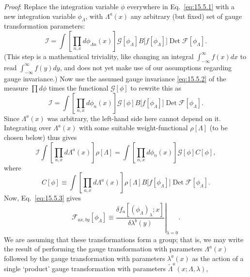 \emph{Proof}: Replace the integration variable $\phi$ everywhere in
Eq.~\eqref{eq:15.5.1} with a new integration variable $\phi_\Lambda$, with
$\Lambda^a(x)$ any arbitrary (but fixed) set of gauge transformation
parameters:
\begin{equation}
  \mathcal I=\int\left[\prod_{n,x}d\phi_{\Lambda n}(x)\right]
  \mathcal G[\phi_\Lambda]B\bigl[f[\phi_\Lambda]\bigr]
  \operatorname{Det}\mathcal F[\phi_\Lambda].
  \tag{15.5.8}\label{eq:15.5.8}
\end{equation}
(This step is a mathematical triviality, like changing an integral
$\int_{-\infty}^{\infty}f(x)dx$ to read
$\int_{-\infty}^{\infty}f(y)dy$, and does not yet make use of our assumptions
regarding gauge invariance.) Now use the assumed gauge invariance
\eqref{eq:15.5.2} of the measure $\prod d\phi$ times the functional
$\mathcal G[\phi]$ to rewrite this as
\begin{equation}
  \mathcal I=\int\left[\prod_{n,x}d\phi_n(x)\right]
  \mathcal G[\phi]B\bigl[f[\phi_\Lambda]\bigr]
  \operatorname{Det}\mathcal F[\phi_\Lambda].
  \tag{15.5.9}\label{eq:15.5.9}
\end{equation}
Since $\Lambda^a(x)$ was arbitrary, the left-hand side here cannot depend
on it. Integrating over $\Lambda^a(x)$ with some suitable
weight-functional $\rho[\Lambda]$ (to be chosen below) thus gives
\begin{equation}
  \mathcal I\int\left[\prod_{a,x}d\Lambda^a(x)\right]\rho[\Lambda]
  =\int\left[\prod_{n,x}d\phi_n(x)\right]\mathcal G[\phi]C[\phi],
  \tag{15.5.10}\label{eq:15.5.10}
\end{equation}
where
\begin{equation}
  C[\phi]\equiv\int\left[\prod_{a,x}d\Lambda^a(x)\right]
  \rho[\Lambda]B\bigl[f[\phi_\Lambda]\bigr]
  \operatorname{Det}\mathcal F[\phi_\Lambda].
  \tag{15.5.11}\label{eq:15.5.11}
\end{equation}
Now, Eq.~\eqref{eq:15.5.3} gives
\begin{equation}
  \mathcal F_{a x,b y}[\phi_\Lambda]
  \equiv\left.\frac{\delta f_a[(\phi_\Lambda)_\lambda;x]}
  {\delta\lambda^b(y)}\right|_{\lambda=0}.
  \tag{15.5.12}\label{eq:15.5.12}
\end{equation}
We are assuming that these transformations form a group; that is, we may
write the result of performing the gauge transformation with parameters
$\Lambda^a(x)$ followed by the gauge transformation with parameters
$\lambda^a(x)$ as the action of a single `product' gauge transformation
with parameters $\widetilde\Lambda^a(x;\Lambda,\lambda)$,
